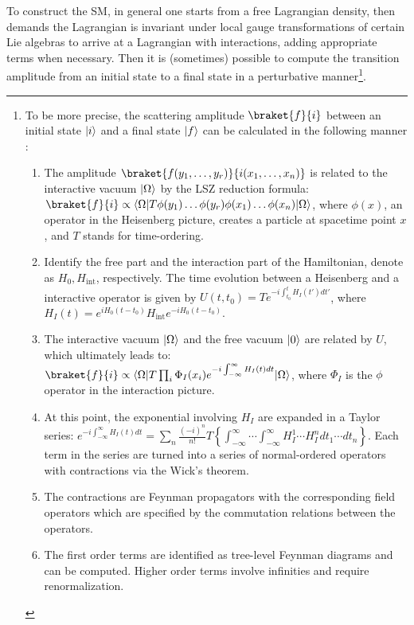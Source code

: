 To construct the SM,
in general one starts from a free Lagrangian density,
then demands the Lagrangian is invariant under local gauge transformations of
certain Lie algebras to arrive at a Lagrangian with interactions,
adding appropriate terms when necessary.
Then it is (sometimes) possible to compute the transition amplitude from an
initial state to a final state in a perturbative manner\footnote{
    To be more precise, the scattering amplitude $\braket{f}{i}$
    between an initial state $\lvert i\rangle$
    and a final state $\lvert f\rangle$
    can be calculated in the following
    manner \cite{Weigand}:
    \begin{enumerate}
        \item The amplitude $\braket{f(y_1, \dots, y_r)}{i(x_1, \dots, x_n)}$
            is related to the interactive vacuum
            $\lvert\Omega\rangle$ by the LSZ reduction formula:
            $\braket{f}{i} \propto \bra{\Omega} T \phi(y_1) \dots \phi(y_r) \phi(x_1) \dots \phi(x_n) \ket{\Omega}$,
            where $\phi(x)$, an operator in the Heisenberg picture,
            creates a particle at spacetime point $x$,
            and $T$ stands for time-ordering.

        \item Identify the free part and the interaction part of the Hamiltonian,
            denote as $H_0, H_\text{int}$,
            respectively.
            The time evolution between a Heisenberg and a interactive operator
            is given by
            $U(t, t_0) = T e^{-i \int_{t_0}^t H_I(t') d t'}$,
            where $H_I(t) = e^{iH_0(t-t_0)} H_\text{int} e^{-iH_0(t-t_0)}$.

        \item The interactive vacuum $\lvert\Omega\rangle$ and the free vacuum
            $\lvert0\rangle$ are related by $U$,
            which ultimately leads to:
            $\braket{f}{i} \propto \bra{\Omega} T \prod_i \Phi_I(x_i) e^{-i \int_{-\infty}^{\infty} H_I(t) dt} \ket{\Omega}$,
            where $\Phi_I$ is the $\phi$ operator in the interaction picture.

        \item At this point,
            the exponential involving $H_I$ are expanded in a Taylor series:
            $e^{-i \int_{-\infty}^{\infty} H_I(t) dt} = \sum_n \frac{(-i)^n}{n!} T\left\{
                \int_{-\infty}^{\infty} \cdots \int_{-\infty}^{\infty}
                H_{I}^1 \cdots H_{I}^n d t_1 \cdots d t_n
            \right\}$.
            Each term in the series are turned into a series of
            normal-ordered operators with contractions via the Wick's theorem.

        \item The contractions are Feynman propagators with the
            corresponding field operators which are specified by the commutation
            relations between the operators.

        \item The first order terms are identified as tree-level Feynman
            diagrams and can be computed.
            Higher order terms involve infinities and require renormalization.
    \end{enumerate}
}.


